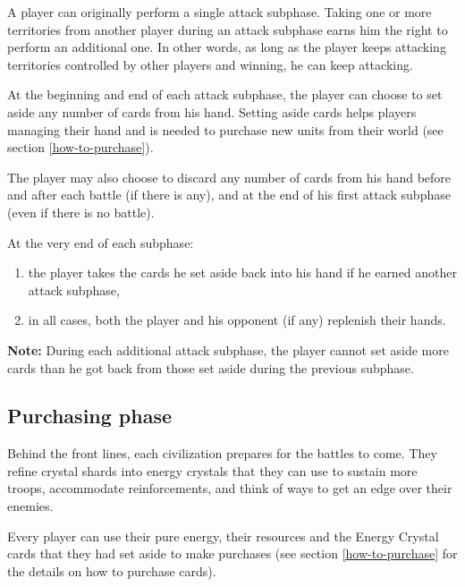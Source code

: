 \documentclass[a4paper]{article}
\begin{document}
        A player can originally perform a single attack subphase.
        Taking one or more territories from another player during an attack subphase
        earns him the right to perform an additional one.
        In other words, as long as the player keeps attacking territories controlled by
        other players and winning, he can keep attacking.
        
        At the beginning and end of each attack subphase,
        the player can choose to set aside any number of cards from his hand.
        Setting aside cards helps players managing their hand
        and is needed to purchase new units from their world
        (see section \ref{how-to-purchase}).
        
        The player may also choose to discard any number of cards from his hand
        before and after each battle (if there is any), and at the end of his first
        attack subphase (even if there is no battle).
        
        At the very end of each subphase:
        \vspace{-1.3em}
        \begin{enumerate}
            \item the player takes the cards he set aside back into his hand if he earned
                     another attack subphase,
            \item in all cases, both the player and his opponent (if any)
                     replenish their hands.
        \end{enumerate}
        
        \textbf{Note:} During each additional attack subphase,
                              the player cannot set aside more cards than he got back from
                              those set aside during the previous subphase.
        
    
    \subsection{Purchasing phase}
        \label{purchase}
        Behind the front lines, each civilization prepares for the battles to come.
        They refine crystal shards into energy crystals that they can use to
        sustain more troops, accommodate reinforcements,
        and think of ways to get an edge over their enemies.
        
        Every player can use their pure energy, their resources
        and the Energy Crystal cards that they had set aside to make purchases
        (see section \ref{how-to-purchase} for the details on how to purchase cards).
        
\end{document}

